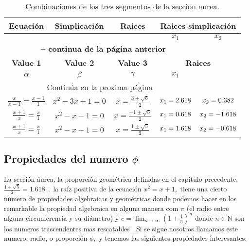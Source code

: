 \documentclass[a4paper]{book}
\newcommand{\qw}{\phi}
\newcommand{\pa}[1]{\left(#1\right)}
\begin{document}
\begin{longtable}{ccccc}
	\caption{Combinaciones de los tres segmentos de la seccion aurea.}
	\label{tab:w1wwwww}\\
	\toprule
	\textbf{Ecuación} & \textbf{Simplicación} & \textbf{Raices}& \multicolumn{2}{c}{\textbf{Raices simplicación}}\\\midrule
	 &  &  & $x_1$ & $x_2$ \\
	\midrule
	\endfirsthead %
 \multicolumn{4}{c}{{\bfseries \tablename\ \thetable{} -- continua de la página anterior}} \\
	\toprule
	\textbf{Value 1} & \textbf{Value 2} & \textbf{Value 3}& \multicolumn{2}{c}{\textbf{Raices}}\\\midrule
	$\alpha$ & $\beta$ & $\gamma$ & $x_1$ \\
	\midrule
	\endhead
	\multicolumn{4}{c}{{Continúa en la proxima página}} \\ \midrule
	\endfoot
	\bottomrule
	\endlastfoot
	$\frac{x}{x-1}=\frac{x-1}{1}$&$ x^2-3x+1=0 $ & $x=\frac{3\pm\sqrt{5}}{2}$  & $x_1=\fpeval{round((3+sqrt(5))/2,3)}$ & $x_2=\fpeval{round((3-sqrt(5))/2,3)}$\\\midrule
	$\frac{x+1}{x}=\frac{x}{1}$&$ x^2-x-1=0$     & $x=\frac{-1\pm\sqrt{5}}{2}$  & $x_1=\fpeval{round((-1+sqrt(5))/2,3)}$ & $x_2=\fpeval{round((-1-sqrt(5))/2,3)}$\\\midrule
	$\frac{x+1}{x}=\frac{x}{1}$&$ x^2-x-1=0$     & $x=\frac{1\pm\sqrt{5}}{2}$  & $x_1=\fpeval{round((1+sqrt(5))/2,3)}$ & $x_2=\fpeval{round((1-sqrt(5))/2,3)}$\\
\end{longtable}


\subsection{Propiedades del numero $\phi$}

La sección áurea, la proporción geométrica definidas en el capitulo precedente, $\frac{1+\sqrt{5}}{2}=1.618...$ la raíz positiva de la ecuación $x^2=x+1,$ tiene una cierto número de propiedades  algebraicas  y geométricas   donde podemos hacer en los remarkable la propiedad algebraica  en alguna manera  com $\pi$ (el radio entre alguna circunferencia y su diámetro) y $e=\lim_{n\longrightarrow \infty}\pa{1+\frac{1}{n}}^n$ donde $n\in \mathbb{N}$ son los numeros trascendentes  mas rescatables  .
Si  se sigue nosotros llamamos este numero, radio, o proporción $\qw,$  y tenemos las siguientes propiedades interesantes:
\end{document}
